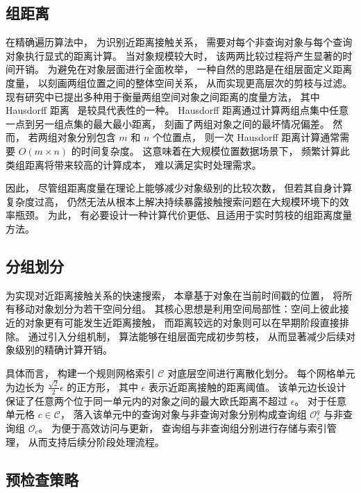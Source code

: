 \subsection{组距离}

在精确遍历算法中， 为识别近距离接触关系， 需要对每个非查询对象与每个查询对象执行显式的距离计算。 当对象规模较大时， 该两两比较过程将产生显著的时间开销。 为避免在对象层面进行全面枚举， 一种自然的思路是在组层面定义距离度量， 以刻画两组位置之间的整体空间关系， 从而实现更高层次的剪枝与过滤。 现有研究中已提出多种用于衡量两组空间对象之间距离的度量方法， 其中 Hausdorff 距离~ 是较具代表性的一种。 Hausdorff 距离通过计算两组点集中任意一点到另一组点集的最大最小距离， 刻画了两组对象之间的最坏情况偏差。 然而， 若两组对象分别包含 $m$ 和 $n$ 个位置点， 则一次 Hausdorff 距离计算通常需要 $O(m \times n)$ 的时间复杂度。 这意味着在大规模位置数据场景下， 频繁计算此类组距离将带来较高的计算成本， 难以满足实时处理需求。

因此， 尽管组距离度量在理论上能够减少对象级别的比较次数， 但若其自身计算复杂度过高， 仍然无法从根本上解决持续暴露接触搜索问题在大规模环境下的效率瓶颈。 为此， 有必要设计一种计算代价更低、且适用于实时剪枝的组距离度量方法。

\subsection{分组划分}

为实现对近距离接触关系的快速搜索， 本章基于对象在当前时间戳的位置， 将所有移动对象划分为若干空间分组。 其核心思想是利用空间局部性：空间上彼此接近的对象更有可能发生近距离接触， 而距离较远的对象则可以在早期阶段直接排除。 通过引入分组机制， 算法能够在组层面完成初步剪枝， 从而显著减少后续对象级别的精确计算开销。

具体而言， 构建一个规则网格索引 $\mathcal{C}$ 对底层空间进行离散化划分。 每个网格单元为边长为 $\frac{\sqrt{2}}{2}\epsilon$ 的正方形， 其中 $\epsilon$ 表示近距离接触的距离阈值。 该单元边长设计保证了任意两个位于同一单元内的对象之间的最大欧氏距离不超过 $\epsilon$。 对于任意单元格 $c \in \mathcal{C}$， 落入该单元中的查询对象与非查询对象分别构成查询组 $\mathcal{O}_c^q$ 与非查询组 $\mathcal{O}_c$。 为便于高效访问与更新， 查询组与非查询组分别进行存储与索引管理， 从而支持后续分阶段处理流程。


\subsection{预检查策略}



